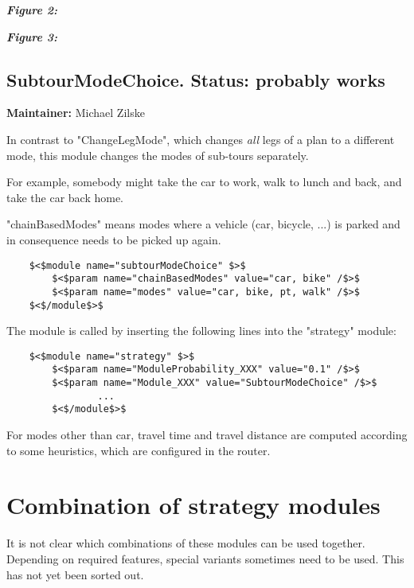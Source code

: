 \documentclass[a4paper,11pt]{report}
\begin{document}
\emph{\textbf{Figure 2:}}





\emph{\textbf{Figure 3:}}








\subsection{SubtourModeChoice. Status: probably works}

\textbf{Maintainer:} Michael Zilske

In contrast to "ChangeLegMode", which changes \emph{all} legs of a plan to a different mode, this module changes the modes of sub-tours separately.

For example, somebody might take the car to work, walk to lunch and back, and take the car back home.

"chainBasedModes" means modes where a vehicle (car, bicycle,  ...) is parked and in consequence needs to be picked up again.
\begin{verbatim}
	$<$module name="subtourModeChoice" $>$
		$<$param name="chainBasedModes" value="car, bike" /$>$
		$<$param name="modes" value="car, bike, pt, walk" /$>$
	$<$/module$>$

\end{verbatim}

The module is called by inserting the following lines into the "strategy" module:
\begin{verbatim}
	$<$module name="strategy" $>$
		$<$param name="ModuleProbability_XXX" value="0.1" /$>$
		$<$param name="Module_XXX" value="SubtourModeChoice" /$>$
                ...
        $<$/module$>$

\end{verbatim}


For modes other than car, travel time and travel distance are  computed according to some heuristics, which are configured in the  router.

\vfill\eject
\section{Combination of strategy modules}

It  is not clear which combinations of these modules can be used together.  Depending on required features, special variants sometimes need to be  used. This has not yet been sorted out.
\end{document}
